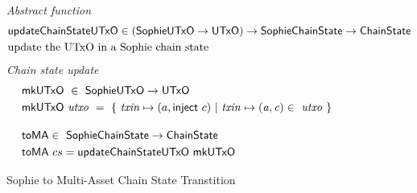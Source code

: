 \begin{figure}[htb]
  \emph{Abstract function}
  \begin{align*}
      & \mathsf{updateChainStateUTxO} \in (\mathsf{SophieUTxO} \to \mathsf{UTxO}) \to \mathsf{SophieChainState} \to \mathsf{ChainState} \\
      & \text{update the UTxO in a Sophie chain state}
  \end{align*}
  \emph{Chain state update}
  \begin{align*}
      & \fun{mkUTxO} ~\in~ \SophieUTxO  \to \UTxO  \\
      & \fun{mkUTxO}~\var{utxo} ~=~ \{~ \var{txin} \mapsto (a,\fun{inject}~c) ~\vert~
      \var{txin} \mapsto \var{(a,c)}\in ~\var{utxo}~\}
      \nextdef
      & \fun{toMA} \in ~ \SophieChainState \to \ChainState \\
      & \fun{toMA}~cs = \fun{updateChainStateUTxO}~\fun{mkUTxO}
  \end{align*}
  \caption{Sophie to Multi-Asset Chain State Transtition}
  \label{fig:functions:to-ma}
\end{figure}
